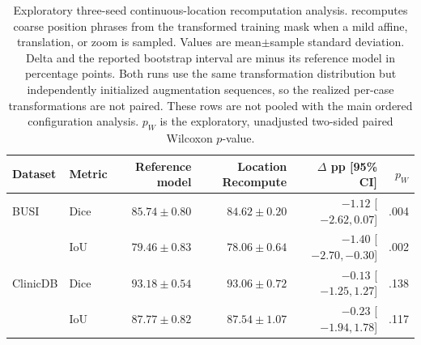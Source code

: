 \ifnum{}
\begin{table}[htbp]
\centering
\caption{Exploratory three-seed continuous-location recomputation analysis.
\locrecompute{}
recomputes coarse position phrases from the transformed training mask when a
mild affine, translation, or zoom is sampled. Values are mean$\pm$sample
standard deviation. Delta and the reported bootstrap interval are
\locrecompute{} minus its reference model in percentage points. Both runs use
the same transformation distribution but independently initialized augmentation
sequences, so the realized per-case transformations are not paired. These
rows are not pooled with the main ordered configuration analysis. $p_W$ is the exploratory, unadjusted two-sided
paired Wilcoxon $p$-value.}
\label{tab:continuous_location_diagnostic}
\small
\setlength{\tabcolsep}{4.2pt}
\begin{tabular}{@{}llrrrr@{}}
\toprule
Dataset & Metric & Reference model & Location Recompute & $\Delta$ pp [95\% CI] & $p_W$ \\
\midrule
BUSI & Dice & $85.74\pm0.80$ & $84.62\pm0.20$ & $-1.12$ [$-2.62,0.07$] & .004 \\
     & IoU  & $79.46\pm0.83$ & $78.06\pm0.64$ & $-1.40$ [$-2.70,-0.30$] & .002 \\
ClinicDB & Dice & $93.18\pm0.54$ & $93.06\pm0.72$ & $-0.13$ [$-1.25,1.27$] & .138 \\
         & IoU  & $87.77\pm0.82$ & $87.54\pm1.07$ & $-0.23$ [$-1.94,1.78$] & .117 \\
\bottomrule
\end{tabular}
\end{table}
\fi
